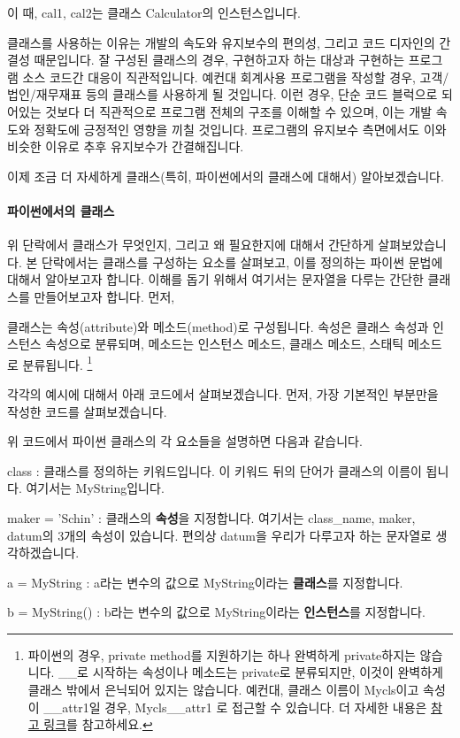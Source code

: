 \documentclass[twoside]{article}
\begin{document}


이 때, cal1, cal2는 클래스 Calculator의 인스턴스입니다. 

클래스를 사용하는 이유는 개발의 속도와 유지보수의 편의성, 그리고 코드 디자인의 간결성 때문입니다. 잘 구성된 클래스의 경우, 구현하고자 하는 대상과 구현하는 프로그램 소스 코드간 대응이 직관적입니다. 예컨대 회계사용 프로그램을 작성할 경우, 고객/법인/재무재표 등의 클래스를 사용하게 될 것입니다. 이런 경우, 단순 코드 블럭으로 되어있는 것보다 더 직관적으로 프로그램 전체의 구조를 이해할 수 있으며, 이는 개발 속도와 정확도에 긍정적인 영향을 끼칠 것입니다. 프로그램의 유지보수 측면에서도 이와 비슷한 이유로 추후 유지보수가 간결해집니다. 

이제 조금 더 자세하게 클래스(특히, 파이썬에서의 클래스에 대해서) 알아보겠습니다. 

\paragraph{파이썬에서의 클래스} 

위 단락에서 클래스가 무엇인지, 그리고 왜 필요한지에 대해서 간단하게 살펴보았습니다. 본 단락에서는 클래스를 구성하는 요소를 살펴보고, 이를 정의하는 파이썬 문법에 대해서 알아보고자 합니다. 이해를 돕기 위해서 여기서는 문자열을 다루는 간단한 클래스를 만들어보고자 합니다. 먼저, 

클래스는 속성(attribute)와 메소드(method)로 구성됩니다. 속성은 클래스 속성과 인스턴스 속성으로 분류되며, 메소드는 인스턴스 메소드, 클래스 메소드, 스태틱 메소드로 분류됩니다. \footnote{파이썬의 경우, private method를 지원하기는 하나 완벽하게 private하지는 않습니다. \_\_로 시작하는 속성이나 메소드는 private로 분류되지만, 이것이 완벽하게 클래스 밖에서 은닉되어 있지는 않습니다. 예컨대, 클래스 이름이 Mycls이고 속성이 \_\_attr1일 경우, Mycls\_\_attr1 로 접근할 수 있습니다. 더 자세한 내용은 \href{http://www.diveintopython.net/object\_oriented\_framework/private\_functions.html}{참고 링크}를 참고하세요. } 

각각의 예시에 대해서 아래 코드에서 살펴보겠습니다. 먼저, 가장 기본적인 부분만을 작성한 코드를 살펴보겠습니다. 



위 코드에서 파이썬 클래스의 각 요소들을 설명하면 다음과 같습니다. 
\begin{compactitem} 
\item class : 클래스를 정의하는 키워드입니다. 이 키워드 뒤의 단어가 클래스의 이름이 됩니다. 여기서는 MyString입니다. 
\item maker = 'Schin' : 클래스의 \textbf{속성}을 지정합니다. 여기서는 class\_name, maker, datum의 3개의 속성이 있습니다. 편의상 datum을 우리가 다루고자 하는 문자열로 생각하겠습니다. 
\item a = MyString : a라는 변수의 값으로 MyString이라는 \textbf{클래스}를 지정합니다. 
\item b = MyString() : b라는 변수의 값으로 MyString이라는 \textbf{인스턴스}를 지정합니다. 
\end{compactitem}
\end{document}
